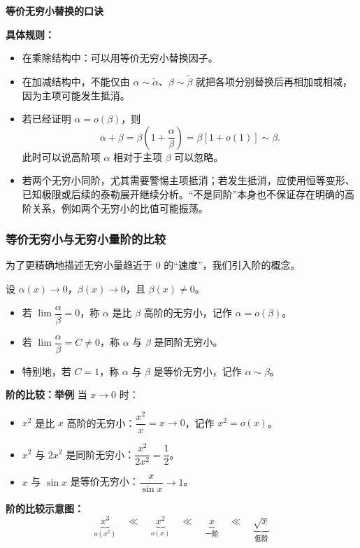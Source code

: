 \documentclass[fontset=fandol]{ctexart}
\newenvironment{custom}[1]{\par\noindent\textbf{#1}\quad}{\par\vspace{0.8em}}
\begin{document}
\begin{custom}{等价无穷小替换的口诀}
\begin{center}
\end{center}

\textbf{具体规则：}
\begin{itemize}
\item 在乘除结构中：可以用等价无穷小替换因子。
\item 在加减结构中，不能仅由 $\alpha\sim\widetilde\alpha$、$\beta\sim\widetilde\beta$ 就把各项分别替换后再相加或相减，因为主项可能发生抵消。
\item 若已经证明 $\alpha=o(\beta)$，则
\[
\alpha+\beta
=\beta\left(1+\frac{\alpha}{\beta}\right)
=\beta[1+o(1)]
\sim\beta.
\]
此时可以说高阶项 $\alpha$ 相对于主项 $\beta$ 可以忽略。
\item 若两个无穷小同阶，尤其需要警惕主项抵消；若发生抵消，应使用恒等变形、已知极限或后续的泰勒展开继续分析。“不是同阶”本身也不保证存在明确的高阶关系，例如两个无穷小的比值可能振荡。
\end{itemize}
\end{custom}

\subsubsection{等价无穷小与无穷小量阶的比较}

为了更精确地描述无穷小量趋近于 0 的“速度”，我们引入阶的概念。

\begin{definition}[无穷小的阶]
设 \(\alpha(x) \to 0\)，\(\beta(x) \to 0\)，且 \(\beta(x) \neq 0\)。
\begin{itemize}
\item 若 \(\lim \dfrac{\alpha}{\beta} = 0\)，称 \(\alpha\) 是比 \(\beta\) 高阶的无穷小，记作 \(\alpha = o(\beta)\)。
\item 若 \(\lim \dfrac{\alpha}{\beta} = C \neq 0\)，称 \(\alpha\) 与 \(\beta\) 是同阶无穷小。
\item 特别地，若 \(C = 1\)，称 \(\alpha\) 与 \(\beta\) 是等价无穷小，记作 \(\alpha \sim \beta\)。
\end{itemize}
\end{definition}

\begin{custom}{阶的比较：举例}
当 \(x \to 0\) 时：
\begin{itemize}
\item \(x^2\) 是比 \(x\) 高阶的无穷小：\(\dfrac{x^2}{x} = x \to 0\)，记作 \(x^2 = o(x)\)。
\item \(x^2\) 与 \(2x^2\) 是同阶无穷小：\(\dfrac{x^2}{2x^2} = \dfrac{1}{2}\)。
\item \(x\) 与 \(\sin x\) 是等价无穷小：\(\dfrac{x}{\sin x} \to 1\)。
\end{itemize}

\textbf{阶的比较示意图：}
\[
\underbrace{x^3}_{o(x^2)} \quad \ll \quad \underbrace{x^2}_{o(x)} \quad \ll \quad \underbrace{x}_{\text{一阶}} \quad \ll \quad \underbrace{\sqrt{x}}_{\text{低阶}}
\]
\end{custom}
\end{document}
